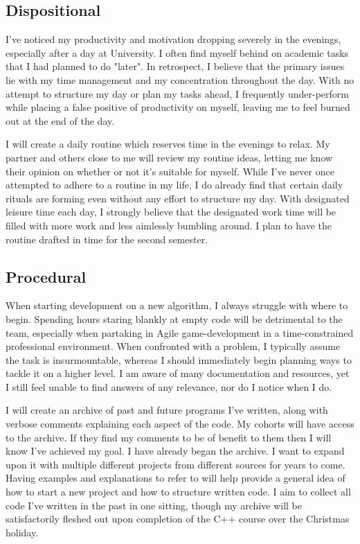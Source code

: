 \documentclass{article}
\begin{document}
\subsection{Dispositional}

I've noticed my productivity and motivation dropping severely in the evenings, especially after a day at University.
I often find myself behind on academic tasks that I had planned to do "later".
In retrospect, I believe that the primary issues lie with my time management and my concentration throughout the day.
With no attempt to structure my day or plan my tasks ahead, I frequently under-perform while placing a false positive of productivity on myself, leaving me to feel burned out at the end of the day.

I will create a daily routine which reserves time in the evenings to relax.
My partner and others close to me will review my routine ideas, letting me know their opinion on whether or not it's suitable for myself.
While I've never once attempted to adhere to a routine in my life, I do already find that certain daily rituals are forming even without any effort to structure my day.
With designated leisure time each day, I strongly believe that the designated work time will be filled with more work and less aimlessly bumbling around.
I plan to have the routine drafted in time for the second semester.

\newpage

\subsection{Procedural}

When starting development on a new algorithm, I always struggle with where to begin.
Spending hours staring blankly at empty code will be detrimental to the team, especially when partaking in Agile game-development in a time-constrained professional environment.
When confronted with a problem, I typically assume the task is insurmountable, whereas I should immediately begin planning ways to tackle it on a higher level.
I am aware of many documentation and resources, yet I still feel unable to find answers of any relevance, nor do I notice when I do.

I will create an archive of past and future programs I've written, along with verbose comments explaining each aspect of the code.
My cohorts will have access to the archive. If they find my comments to be of benefit to them then I will know I've achieved my goal.
I have already began the archive. I want to expand upon it with multiple different projects from different sources for years to come.
Having examples and explanations to refer to will help provide a general idea of how to start a new project and how to structure written code.
I aim to collect all code I've written in the past in one sitting, though my archive will be satisfactorily fleshed out upon completion of the C++ course over the Christmas holiday.
\end{document}
